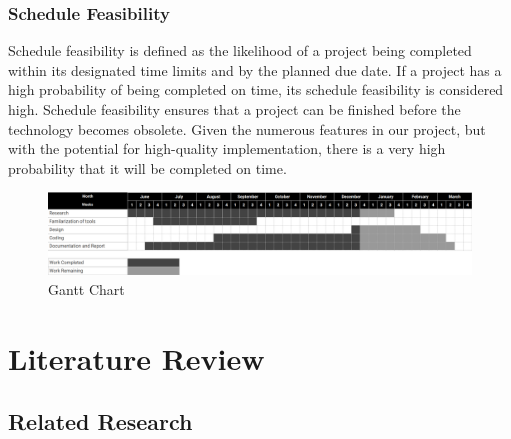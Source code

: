 \subsection{Schedule Feasibility}
Schedule feasibility is defined as the likelihood of a project being completed within its designated time limits and by the planned due date. If a project has a high probability of being completed on time, its schedule feasibility is considered high. Schedule feasibility ensures that a project can be finished before the technology becomes obsolete. Given the numerous features in our project, but with the potential for high-quality implementation, there is a very high probability that it will be completed on time.
\begin{figure}[h!]
    \centering
    \includegraphics[scale=0.6]{images/Ganttchart.png}
    \caption{Gantt Chart}
    \label{fig:my_label}
\end{figure}



\chapter{Literature Review}
\section{Related Research}

